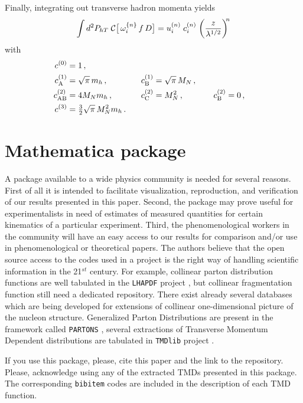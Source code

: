 \documentclass[a4paper,11pt]{article}
\newcommand{\be}{\begin{equation}}
\newcommand{\ee}{\end{equation}}
\def\Phperp{P_{hT}}
\begin{document}
Finally, integrating out transverse hadron momenta yields
\be
	\int d^2\Phperp\;
	{\cal C}\bigl[\,\omega^{\{n\}}_{i} \, f \, D \bigr] 
	= u^{(n)}_{i} \;c^{(n)}_{i}\;\biggl(\frac{z}{\lambda^{1/2}}\biggr)^{\!\!n}
\ee
with
\begin{alignat}{7}
	c^{(0)}_{\rm  } 	&= 1 \, , \\
	c^{(1)}_{\rm A} 	&= \sqrt{\pi}\,m_h	\, , &
	c^{(1)}_{\rm B} 	&= \sqrt{\pi}\,M_N	\, , \\
	c^{(2)}_{\rm AB} 	&= 4M_Nm_h		\, , \;\;\;\;\;\; & 
	c^{(2)}_{\rm C} 	&= M_N^2 		\, , \;\;\;\;\;\;\;\;\;\; & 
	c^{(2)}_{\rm B}	&= 0 			\, ,\\
	c^{(3)}_{\rm  } 	&= {\textstyle\frac32}\sqrt{\pi} \,M_N^2m_h 
	\, . \;\;\;     &
			&
	\label{Eq:Gaussian-integrals-working-IV}
\end{alignat}


\section{Mathematica package}
\label{app:package}

A package available to a wide physics community is needed for several 
reasons. First of all it is intended to facilitate visualization, 
reproduction, and verification of our results presented in this paper. 
Second, the package may prove useful for experimentalists in need of
estimates of measured quantities for certain kinematics of a particular 
experiment. Third, the phenomenological workers in the community 
will have an easy access to our results for comparison and/or use in 
phenomenological or theoretical papers. The authors believe that the 
open source access to the codes used in a project is the right way of 
handling scientific information in the 21$^{st}$ century. For example,
collinear parton distribution functions are well tabulated in 
the \texttt{LHAPDF} project \cite{Buckley:2014ana}, but collinear 
fragmentation function still need a dedicated repository. There exist 
already several databases which are being developed for extensions 
of collinear one-dimensional picture of the nucleon structure.  
Generalized Parton Distributions are present in the framework 
called \texttt{PARTONS} \cite{Berthou:2015oaw}, several extractions 
of Transverse Momentum Dependent distributions are tabulated in 
\texttt{TMDlib} project \cite{Hautmann:2014kza}. 

If you use this package, please, cite this paper and the link to 
the repository. Please, acknowledge using any of the extracted TMDs 
presented in this package. The corresponding \texttt{bibitem} 
codes are included in the description of each TMD function. 
\end{document}
